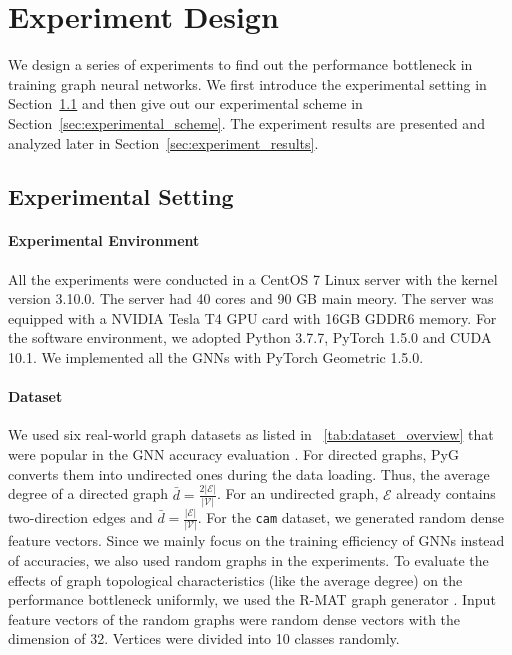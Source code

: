 \section{Experiment Design}

We design a series of experiments to find out the performance bottleneck in training graph neural networks.
We first introduce the experimental setting in Section~\ref{sec:experimental_env} and then give out our experimental scheme in Section~\ref{sec:experimental_scheme}.
The experiment results are presented and analyzed later in Section~\ref{sec:experiment_results}.

\subsection{Experimental Setting}
\label{sec:experimental_env}

\paragraph{Experimental Environment}
All the experiments were conducted in a CentOS 7 Linux server with the kernel version 3.10.0.
The server had 40 cores and 90 GB main meory.
The server was equipped with a NVIDIA Tesla T4 GPU card with 16GB GDDR6 memory.
For the software environment, we adopted Python 3.7.7, PyTorch 1.5.0 and CUDA 10.1.
We implemented all the GNNs with PyTorch Geometric 1.5.0.

\paragraph{Dataset}
We used six real-world graph datasets as listed in \tablename~\ref{tab:dataset_overview} that were popular in the GNN accuracy evaluation \cite{yang2016_revisiting_semisupervised, zeng2020_graphsaint, shchur2018_pitfall_of_gnn}.
For directed graphs, PyG converts them into undirected ones during the data loading.
Thus, the average degree of a directed graph $\bar{d}=\frac{2|\mathcal{E}|}{|\mathcal{V}|}$.
For an undirected graph, $\mathcal{E}$ already contains two-direction edges and $\bar{d}=\frac{|\mathcal{E}|}{|\mathcal{V}|}$.
For the \texttt{cam} dataset, we generated random dense feature vectors.
Since we mainly focus on the training efficiency of GNNs instead of accuracies, we also used random graphs in the experiments.
To evaluate the effects of graph topological characteristics (like the average degree) on the performance bottleneck uniformly, we used the R-MAT graph generator \cite{rmat-generator}.
Input feature vectors of the random graphs were random dense vectors with the dimension of 32.
Vertices were divided into 10 classes randomly.

